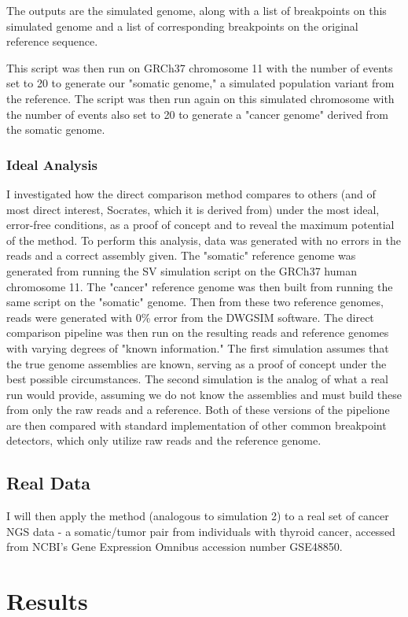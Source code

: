 \documentclass{easychithesis}
\begin{document}
The outputs are the simulated genome, along with a list of breakpoints on this simulated genome and a list of corresponding breakpoints on the original reference sequence.

This script was then run on GRCh37 chromosome 11 with the number of events set to 20 to generate our "somatic genome," a simulated population variant from the reference. The script was then run again on this simulated chromosome with the number of events also set to 20 to generate a "cancer genome" derived from the somatic genome.

\subsection{Ideal Analysis}
I investigated how the direct comparison method compares to others (and of most direct interest, Socrates, which it is derived from) under the most ideal, error-free conditions, as a proof of concept and to reveal the maximum potential of the method. To perform this analysis, data was generated with no errors in the reads and a correct assembly given. The "somatic" reference genome was generated from running the SV simulation script on the GRCh37 human chromosome 11. The "cancer" reference genome was then built from running the same script on the "somatic" genome. Then from these two reference genomes, reads were generated with 0\% error from the DWGSIM software. The direct comparison pipeline was then run on the resulting reads and reference genomes with varying degrees of "known information." The first simulation assumes that the true genome assemblies are known, serving as a proof of concept under the best possible circumstances. The second simulation is the analog of what a real run would provide, assuming we do not know the assemblies and must build these from only the raw reads and a reference. Both of these versions of the pipelione are then compared with standard implementation of other common breakpoint detectors, which only utilize raw reads and the reference genome.

\section{Real Data}
I will then apply the method (analogous to simulation 2) to a real set of cancer NGS data - a somatic/tumor pair from individuals with thyroid cancer, accessed from NCBI's Gene Expression Omnibus accession number GSE48850.

\chapter{Results}
\end{document}
